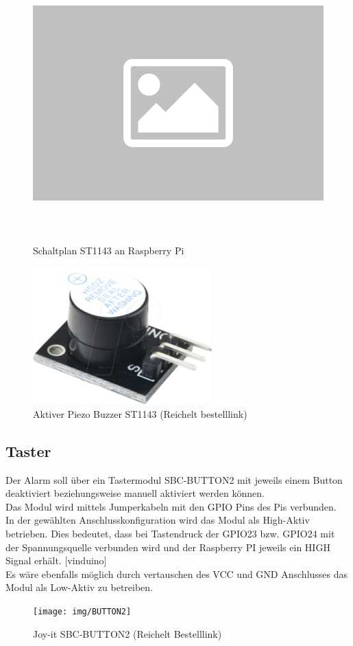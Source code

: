 \documentclass[12pt,a4paper,openany]{scrbook}
\begin{document}
	
	\begin{figure}[!h]
	\centering
	\includegraphics[height=300pt]{img/platzhalter}
	\caption{Schaltplan ST1143 an Raspberry Pi}
	\label{Bildlabel}
	
\end{figure}

	\begin{figure}[H]
	\centering
	\includegraphics[height=150pt]{img/ST1143}
	\caption{Aktiver Piezo Buzzer ST1143 (Reichelt bestelllink)}
	\label{Bildlabel}
	\end{figure}



\subsection{Taster}

Der Alarm soll über ein Tastermodul SBC-BUTTON2 mit jeweils einem Button deaktiviert beziehungsweise manuell aktiviert werden können.\\ 
Das Modul wird mittels Jumperkabeln mit den GPIO Pins des Pis verbunden. \\ 
In der gewählten Anschlusskonfiguration wird das Modul als High-Aktiv betrieben. Dies bedeutet, dass bei Tastendruck der GPIO23 bzw. GPIO24 mit der Spannungsquelle verbunden wird und der Raspberry PI jeweils ein HIGH Signal erhält. [vinduino]\\ 
Es wäre ebenfalls möglich durch vertauschen des VCC und GND Anschlusses das Modul als Low-Aktiv zu betreiben.
	\begin{figure}[H]
	\centering
	\texttt{[image: img/BUTTON2]}
	\caption{Joy-it SBC-BUTTON2 (Reichelt Bestelllink)}
	\label{Bildlabel}
\end{figure}
\end{document}
